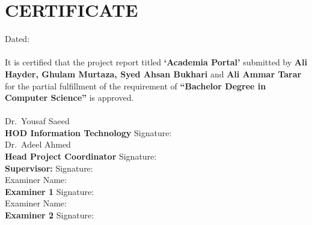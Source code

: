 \chapter*{CERTIFICATE}

\noindent Dated: \underline{\hspace{4cm}}\\

\\

\noindent It is certified that the project report titled \textbf{`Academia Portal'} submitted by \textbf{Ali Hayder, Ghulam Murtaza, Syed Ahsan Bukhari} and \textbf{Ali Ammar Tarar} for the partial fulfillment of the requirement of \textbf{``Bachelor Degree in Computer Science''} is approved.\\

\\

\noindent Dr.\ Yousaf Saeed\\
\textbf{HOD Information Technology} \hfill Signature: \underline{\hspace{4cm}}\\

\noindent Dr.\ Adeel Ahmed\\
\textbf{Head Project Coordinator} \hfill Signature: \underline{\hspace{4cm}}\\


\textbf{Supervisor:} \hfill Signature: \underline{\hspace{4cm}}\\

\noindent Examiner Name:\\
\textbf{Examiner 1} \hfill Signature: \underline{\hspace{4cm}}\\

\noindent Examiner Name:\\
\textbf{Examiner 2} \hfill Signature: \underline{\hspace{4cm}}

\clearpage
